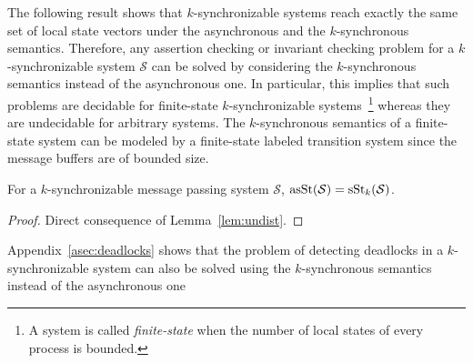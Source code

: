 The following result shows that $k$-synchronizable systems reach exactly the same set of local state vectors under the asynchronous and the $k$-synchronous semantics. Therefore, any assertion checking or invariant checking problem for a $k$-synchronizable system $\mathcal{S}$ can be solved by considering the $k$-synchronous semantics instead of the asynchronous one. In particular, this implies that such problems are decidable for finite-state $k$-synchronizable systems~\footnote{A system is called \emph{finite-state} when the number of local states of every process is bounded.} whereas they are undecidable for arbitrary systems. The $k$-synchronous semantics of a finite-state system can be modeled by a finite-state labeled transition system since the message buffers are of bounded size.

\begin{theorem}
For a $k$-synchronizable message passing system $\mathcal{S}$, $\mathrm{asSt}({\mathcal{S}})=\mathrm{sSt}_{k}({\mathcal{S}})$.
\end{theorem}
\begin{proof}
Direct consequence of Lemma~\ref{lem:undist}.
\end{proof}

Appendix~\ref{asec:deadlocks} shows that the problem of detecting deadlocks in a $k$-synchronizable system can also be solved using the $k$-synchronous semantics instead of the asynchronous one

